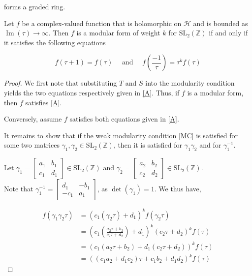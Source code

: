 forms a graded ring.  
\begin{proposition}\label{2.2.7}
     Let $f$ be a complex-valued function that is holomorphic on $\mathcal{H}$ and is bounded as $\operatorname{Im}(\tau) \rightarrow \infty$. Then $f$ is a modular form of weight $k$ for $\mathrm{SL}_{2}(\mathbb{Z})$ if and only if it satisfies the following equations

\begin{equation}\label{A}
f(\tau+1)=f(\tau) \quad \text { and } \quad f\left(\frac{-1}{\tau}\right)=\tau^{k} f(\tau)    
\end{equation}


\begin{proof}
    We first note that substituting $T$ and $S$ into the modularity condition yields the two equations respectively given in \ref{A}. Thus, if $f$ is a modular form, then $f$ satisfies \ref{A}.

Conversely, assume $f$ satisfies both equations given in \ref{A}.

It remains to show that if the weak modularity condition  \ref{MC} is satisfied for some two matrices $\gamma_{1}, \gamma_{2} \in \mathrm{SL}_{2}(\mathbb{Z})$, then it is satisfied for $\gamma_{1} \gamma_{2}$ and for $\gamma_{1}^{-1}$.

Let $\gamma_{1}=\left[\begin{array}{ll}a_{1} & b_{1} \\ c_{1} & d_{1}\end{array}\right] \in \mathrm{SL}_{2}(\mathbb{Z})$ and $\gamma_{2}=\left[\begin{array}{ll}a_{2} & b_{2} \\ c_{2} & d_{2}\end{array}\right] \in \mathrm{SL}_{2}(\mathbb{Z})$. \\Note that $\gamma_{1}^{-1}=\left[\begin{array}{cc}d_{1} & -b_{1} \\ -c_{1} & a_{1}\end{array}\right]$, as $\operatorname{det}\left(\gamma_{1}\right)=1$. 
\bigskip
We thus have,

$$
\begin{aligned}
f\left(\gamma_{1} \gamma_{2} \tau\right) & =\left(c_{1}\left(\gamma_{2} \tau\right)+d_{1}\right)^{k} f\left(\gamma_{2} \tau\right) \\
& =\left(c_{1}\left(\frac{a_{2} \tau+b_{2}}{c_{2} \tau+d_{2}}\right)+d_{1}\right)^{k}\left(c_{2} \tau+d_{2}\right)^{k} f(\tau) \\
& =\left(c_{1}\left(a_{2} \tau+b_{2}\right)+d_{1}\left(c_{2} \tau+d_{2}\right)\right)^{k} f(\tau) \\
& =\left(\left(c_{1} a_{2}+d_{1} c_{2}\right) \tau+c_{1} b_{2}+d_{1} d_{2}\right)^{k} f(\tau)
\end{aligned}
$$


\end{proof}
\end{proposition}
